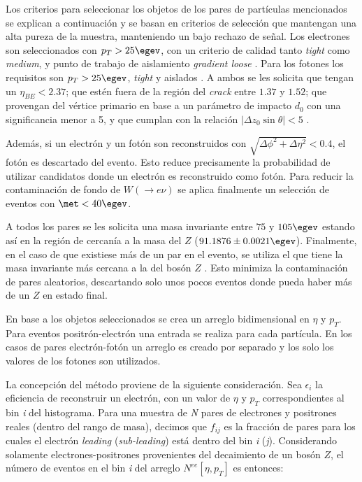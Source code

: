 Los criterios para seleccionar los objetos de los pares de partículas mencionados se explican a continuación y se basan en criterios de selección que mantengan una alta pureza de la muestra, manteniendo un bajo rechazo de señal.
Los electrones  son seleccionados con $p_{T} > 25 \egev$, con un criterio de calidad tanto \textit{tight} como \textit{medium}, y punto de trabajo de aislamiento \textit{gradient loose} \cite{ATLAS-CONF-2016-024}. Para los fotones los requisitos son $p_{T} > 25 \egev$, \textit{tight} y aislados \cite{STDM-2010-08}. A ambos se les solicita que tengan un $\eta_{BE}<2.37$; que estén fuera de la región del \textit{crack} entre $1.37$ y $1.52$; que provengan del vértice primario en base a un parámetro de impacto $d_{0}$ con una significancia menor a 5, y que cumplan con la relación $|\Delta z_{0}\sin\theta|<5$ .

Además, si un electrón y un fotón son reconstruidos con $\sqrt{\Delta\phi^{2}+\Delta\eta^{2}}<0.4$, el fotón es descartado del evento. Esto reduce precisamente la probabilidad de utilizar candidatos donde un electrón es reconstruido como fotón. Para reducir la contaminación de fondo de $W (\rightarrow e\nu)$ se aplica finalmente un selección de eventos con $\met < 40 \egev$. 


A todos los pares se les solicita una masa invariante entre $75$ y $105 \egev$  estando así en la región de cercanía a la masa del $Z$ ($91.1876 \pm 0.0021 \egev$\cite{Olive:2016xmw}). Finalmente, en el caso de que existiese más de un par en el evento, se utiliza el que tiene la masa invariante más cercana a la del bosón $Z$ . Esto minimiza la contaminación de pares aleatorios, descartando solo unos pocos eventos donde pueda haber más de un $Z$ en estado final.


En base a los objetos seleccionados se crea un arreglo bidimensional en  $\eta$ y $p_{T}$. Para eventos positrón-electrón una entrada se realiza para cada partícula. En los casos de pares electrón-fotón un arreglo es creado por separado y los solo los valores de los fotones son utilizados.

La concepción del método proviene de la siguiente consideración. Sea $\epsilon_{i}$ la eficiencia de reconstruir un electrón, con un valor de $\eta$ y $p_{T}$ correspondientes al bin \textit{i} del histograma. Para una muestra de \textit{N} pares de electrones y positrones reales (dentro del rango de masa), decimos que $f_{ij}$ es la fracción de pares para los cuales el electrón \textit{leading} (\textit{sub-leading}) está dentro del bin \textit{i} (\textit{j}). Considerando solamente electrones-positrones provenientes del decaimiento de un bosón $Z$, el número de eventos en el bin \textit{i} del arreglo $N^{ee}[\eta , p_{T}]$ es entonces:

